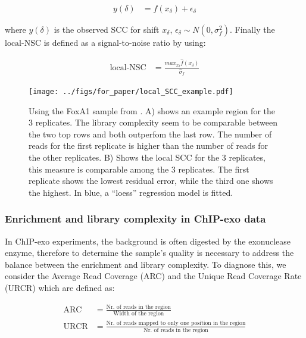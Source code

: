 \documentclass[11pt]{article}\usepackage[]{graphicx}\usepackage[]{color}
\begin{document}
\begin{align}
 y(\delta) &= f(x_\delta) + \epsilon_\delta \nonumber
\end{align}

where $y(\delta)$ is the observed SCC for shift $x_\delta$,
$\epsilon_\delta \sim N(0,\sigma_f^2)$. Finally the $\mbox{local-NSC}$
is defined as a signal-to-noise ratio by using:

\begin{align}
    \mbox{local-NSC} &= \frac{max_{x_\delta} \hat{f}(x_\delta)}{\hat{\sigma}_f} \label{locNSC}
\end{align}

\begin{figure}[H]
  \centering
  \texttt{[image: ../figs/for\_paper/local\_SCC\_example.pdf]}
  \caption{Using the FoxA1 sample from \cite{exoillumina}. A) shows an
    example region for the 3 replicates. The library complexity seem
    to be comparable between the two top rows and both outperfom the
    last row. The number of reads for the first replicate is higher
    than the number of reads for the other replicates. B) Shows the
    local SCC for the 3 replicates, this measure is comparable among
    the 3 replicates. The first replicate shows the lowest residual
    error, while the third one shows the highest. In blue, a ``loess''
    regression model is fitted.}
\label{fig:locSCC}
\end{figure}

\subsubsection{Enrichment and library complexity in ChIP-exo data}
\label{sec:enri}

In ChIP-exo experiments, the background is often digested by the
exonuclease enzyme, therefore to determine the sample's quality is
necessary to address the balance between the enrichment and library
complexity. To diagnose this, we consider the Average Read Coverage
(ARC) and the Unique Read Coverage Rate (URCR) which are defined as:

\begin{align}
  \mbox{ARC} &= \frac{\text{Nr. of reads in the region}}{\text{Width of the region}} \nonumber \\
  \mbox{URCR} &= \frac{\text{Nr. of reads mapped to only one position
      in the region}}{\text{Nr. of reads in the region}} \nonumber
\end{align}
\end{document}
